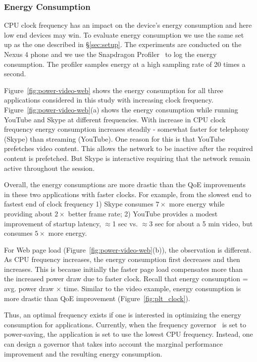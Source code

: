 \subsubsection{Energy Consumption}
CPU clock frequency has an impact on the device's energy consumption and here low end devices may win. To evaluate 
energy consumption we use the same set up as the one described in \S\ref{sec:setup}. The experiments are conducted on the Nexus 4 phone and we use the Snapdragon Profiler~\cite{qualsnap} to log the energy consumption. The profiler samples energy at a high sampling rate of 20 times a second. %

Figure~\ref{fig:power-video-web}
shows the energy consumption for all three applications
considered in this study with increasing 
clock frequency. Figure~\ref{fig:power-video-web}(a) shows the energy consumption while running YouTube and Skype at different frequencies. With increase in CPU clock frequency energy consumption increases steadily - somewhat faster for telephony (Skype) than streaming (YouTube). One reason for this is that YouTube prefetches video content. This allows the network to be inactive after the required content is prefetched. But Skype is interactive requiring that the network remain active throughout the session. 

Overall, the energy consumptions are more
drastic than the QoE improvements in these two applications
with faster clocks. For example, from the slowest end to fastest
end of clock frequency 1) Skype consumes $7\times$ more 
energy  while providing about $2\times$ better
frame rate; 2)  YouTube provides a modest
improvement of startup latency, $\approx$1 sec vs. 
$\approx$3 sec for about a 5 min video, but consumes
$5\times$ more energy. 

For Web page load (Figure~\ref{fig:power-video-web}(b)), 
the observation is different. As CPU frequency increases, the 
energy consumption first decreases and then increases. This 
is because initially the faster page load compensates
more than the increased power draw due to faster 
clock. Recall that 
energy consumption = avg. power draw $\times$ time. Similar to the video example, energy consumption is more drastic than QoE improvement (Figure~\ref{fig:plt_clock}). %

Thus, an optimal frequency exists if one is interested
in optimizing the energy consumption for applications. Currently, when the frequency governor~\cite{ad-governors} is set to power-saving, the application is set to use the lowest CPU frequency. Instead, one can design a governor that takes into account the marginal performance improvement and the resulting energy consumption. 


